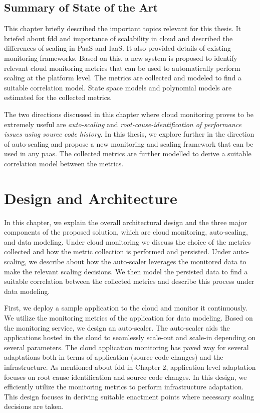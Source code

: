 \documentclass[article,type=msc,colorback,12pt,accentcolor=tud8b,table]{tudthesis}
\begin{document}
\subsection{Summary of State of the Art}
This chapter briefly described the important topics relevant for this thesis. It briefed about \gls{fdd} and importance of scalability in cloud and described the differences of scaling in PaaS and IaaS. It also provided details of existing monitoring frameworks. Based on this, a new system is proposed to identify relevant cloud monitoring metrics that can be used to automatically perform scaling at the platform level. The metrics are collected and modeled to find a suitable correlation model. State space models and polynomial models are estimated for the collected metrics. 

The two directions discussed in this chapter where cloud monitoring proves to be extremely useful are \textit{auto-scaling} and \textit{root-cause-identification of performance issues using source code history}. In this thesis, we explore further in the direction of auto-scaling and propose a new monitoring and scaling framework that can be used in any \gls{paas}. The collected metrics are further modelled to derive a suitable correlation model between the metrics.
	
 \cleardoublepage

 \hfill 
 \section{Design and Architecture}	
 \hfill \break
 
 In this chapter, we explain the overall architectural design and the three major components of the proposed solution, which are cloud monitoring, auto-scaling, and data modeling. Under cloud monitoring we discuss the choice of the metrics collected and how the metric collection is performed and persisted. Under auto-scaling, we describe about how the auto-scaler leverages the monitored data to make the relevant scaling decisions. We then model the persisted data to find a suitable correlation between the collected metrics and describe this process under data modeling. 
 
 	First, we deploy a sample application to the cloud and monitor it continuously. We utilize the monitoring metrics of the application for data modeling. Based on the monitoring service, we design an auto-scaler. The auto-scaler aids the applications hosted in the cloud to seamlessly scale-out and scale-in depending on several parameters. The cloud application monitoring has paved way for several adaptations both in terms of application (source code changes) and the infrastructure. As mentioned about \gls{fdd}  in Chapter 2, application level adaptation focuses on root cause identification and source code changes. In this design, we efficiently utilize  the monitoring metrics to perform infrastructure adaptation.  This design focuses in deriving suitable enactment points where necessary scaling decisions are taken. 
 
\end{document}
